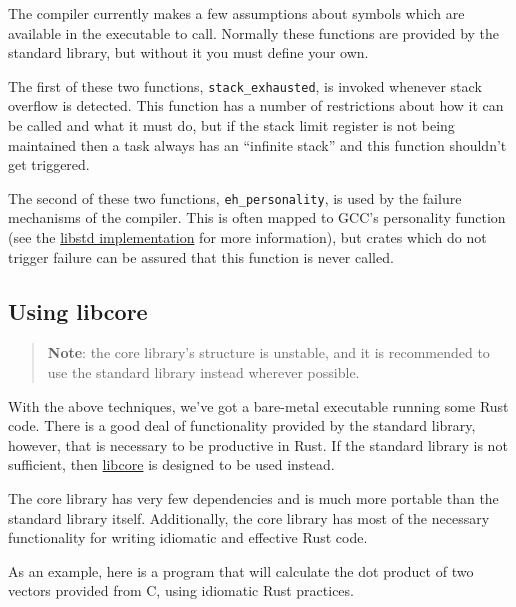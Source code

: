 \documentclass[]{article}
\begin{document}
The compiler currently makes a few assumptions about symbols which are
available in the executable to call. Normally these functions are
provided by the standard library, but without it you must define your
own.

The first of these two functions, \texttt{stack\_exhausted}, is invoked
whenever stack overflow is detected. This function has a number of
restrictions about how it can be called and what it must do, but if the
stack limit register is not being maintained then a task always has an
``infinite stack'' and this function shouldn't get triggered.

The second of these two functions, \texttt{eh\_personality}, is used by
the failure mechanisms of the compiler. This is often mapped to GCC's
personality function (see the \href{std/rt/unwind/index.html}{libstd
implementation} for more information), but crates which do not trigger
failure can be assured that this function is never called.

\subsection{Using libcore}\label{using-libcore}

\begin{quote}
\textbf{Note}: the core library's structure is unstable, and it is
recommended to use the standard library instead wherever possible.
\end{quote}

With the above techniques, we've got a bare-metal executable running
some Rust code. There is a good deal of functionality provided by the
standard library, however, that is necessary to be productive in Rust.
If the standard library is not sufficient, then
\href{core/index.html}{libcore} is designed to be used instead.

The core library has very few dependencies and is much more portable
than the standard library itself. Additionally, the core library has
most of the necessary functionality for writing idiomatic and effective
Rust code.

As an example, here is a program that will calculate the dot product of
two vectors provided from C, using idiomatic Rust practices.
\end{document}
